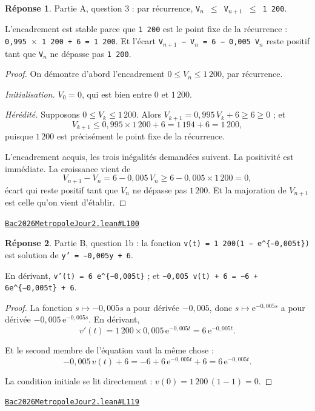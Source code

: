 \documentclass[11pt,a4paper]{article}
\theoremstyle{definition}
\theoremstyle{plain}
\theoremstyle{definition}
\newtheorem*{reponse}{Réponse}
\newcommand{\source}[2]{\par\smallskip\noindent\hfill{\footnotesize\href{#1}{\texttt{#2}}}\par\smallskip}
\begin{document}
\begin{reponse}
Partie A, question 3 : par récurrence, \texttt{V\(_{n}\) \(\le\) V\(_{n+1}\) \(\le\) 1 200}.

L'encadrement est stable parce que \texttt{1 200} est le point fixe de la récurrence :
\texttt{0,995 \(\times\) 1 200 + 6 = 1 200}. Et l'écart \texttt{V\(_{n+1}\) − V\(_{n}\) = 6 − 0,005 V\(_{n}\)} reste positif tant
que \texttt{V\(_{n}\)} ne dépasse pas \texttt{1 200}.
\end{reponse}
\begin{proof}
On démontre d'abord l'encadrement $0 \le V_n \le 1\,200$, par récurrence.

\emph{Initialisation.} $V_0 = 0$, qui est bien entre $0$ et $1\,200$.

\emph{Hérédité.} Supposons $0 \le V_k \le 1\,200$. Alors $V_{k+1} = 0{,}995\,V_k + 6 \ge 6
\ge 0$ ; et
\[ V_{k+1} \le 0{,}995 \times 1\,200 + 6 = 1\,194 + 6 = 1\,200 , \]
puisque $1\,200$ est précisément le point fixe de la récurrence.

L'encadrement acquis, les trois inégalités demandées suivent. La positivité est immédiate.
La croissance vient de
\[ V_{n+1} - V_n = 6 - 0{,}005\,V_n \ge 6 - 0{,}005 \times 1\,200 = 0 , \]
écart qui reste positif tant que $V_n$ ne dépasse pas $1\,200$. Et la majoration de
$V_{n+1}$ est celle qu'on vient d'établir.
\end{proof}
\source{https://github.com/Commutator-IO/learn-lean/blob/main/exams/2026/Bac2026MetropoleJour2.lean\#L100}{Bac2026MetropoleJour2.lean\#L100}

\begin{reponse}
Partie B, question 1b : la fonction \texttt{v(t) = 1 200(1 − e\textasciicircum{}\{−0,005t\})} est solution de
\texttt{y' = −0,005y + 6}.

En dérivant, \texttt{v'(t) = 6 e\textasciicircum{}\{−0,005t\}} ; et \texttt{−0,005 v(t) + 6 = −6 + 6e\textasciicircum{}\{−0,005t\} + 6}.
\end{reponse}
\begin{proof}
La fonction $s \mapsto -0{,}005s$ a pour dérivée $-0{,}005$, donc $s \mapsto
\mathrm{e}^{-0{,}005s}$ a pour dérivée $-0{,}005\,\mathrm{e}^{-0{,}005s}$. En dérivant,
\[ v'(t) = 1\,200 \times 0{,}005\,\mathrm{e}^{-0{,}005t}
   = 6\,\mathrm{e}^{-0{,}005t} . \]

Et le second membre de l'équation vaut la même chose :
\[ -0{,}005\,v(t) + 6 = -6 + 6\,\mathrm{e}^{-0{,}005t} + 6 = 6\,\mathrm{e}^{-0{,}005t} . \]

La condition initiale se lit directement : $v(0) = 1\,200\,(1 - 1) = 0$.
\end{proof}
\source{https://github.com/Commutator-IO/learn-lean/blob/main/exams/2026/Bac2026MetropoleJour2.lean\#L119}{Bac2026MetropoleJour2.lean\#L119}
\end{document}
